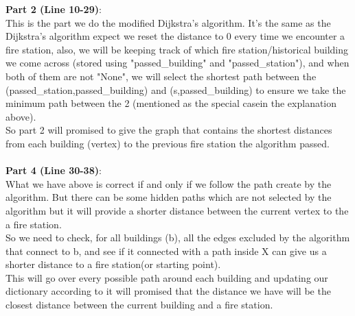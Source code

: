 \documentclass{assignment-373}
\begin{document}
\begin{enumerate}
  {\bf Part 2 (Line 10-29)}:\\
  \phantom{=} \phantom{=} This is the part we do the modified Dijkstra's algorithm. It's the same as the Dijkstra's algorithm expect we reset the distance to 0 every time we encounter a fire station, also, we will be keeping track of which fire station/historical building we come across (stored using "passed\_building" and "passed\_station"), and when both of them are not "None", we will select the shortest path between the (passed\_station,passed\_building) and (s,passed\_building) to ensure we take the minimum path between the 2 (mentioned as the special casein the explanation above).\\
  \phantom{=} \phantom{=} So part 2 will promised to give the graph that contains the shortest distances from each building (vertex) to the previous fire station the algorithm passed.\\\\
  {\bf Part 4 (Line 30-38)}:\\
  \phantom{=} \phantom{=} What we have above is correct if and only if we follow the path create by the algorithm. But there can be some hidden paths which are not selected by the algorithm but it will provide a shorter distance between the current vertex to the a fire station.\\
  \phantom{=} \phantom{=} So we need to check, for all buildings (b), all the edges excluded by the algorithm that connect to b, and see if it connected with a path inside X can give us a shorter distance to a fire station(or starting point). \\
  \phantom{=} \phantom{=} This will go over every possible path around each building and updating our dictionary according to it will promised that the distance we have will be the closest distance between the current building and a fire station.\\\\
  

\end{enumerate}
\end{document}
